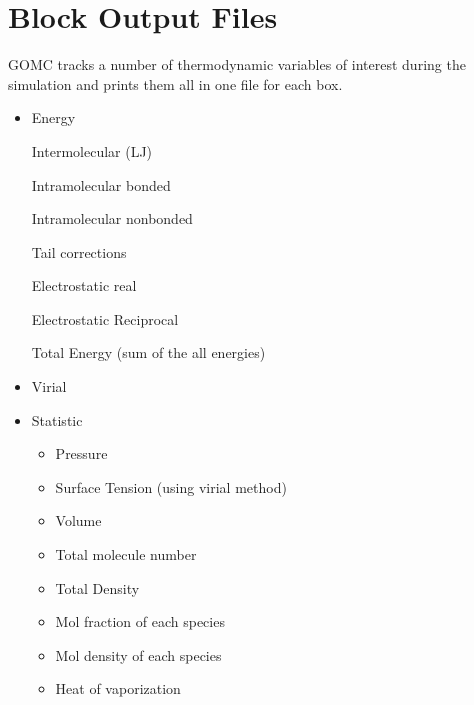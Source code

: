 \documentclass[letterpaper,10pt,english]{sphinxmanual}
\begin{document}
\section{Block Output Files}
\label{\detokenize{output_file:block-output-files}}
\sphinxAtStartPar
GOMC tracks a number of thermodynamic variables of interest during the simulation and prints them all in one file for each box.
\begin{itemize}
\item {} 
\sphinxAtStartPar
Energy

\sphinxAtStartPar
\textendash{} Intermolecular (LJ)

\sphinxAtStartPar
\textendash{} Intramolecular bonded

\sphinxAtStartPar
\textendash{} Intramolecular nonbonded

\sphinxAtStartPar
\textendash{} Tail corrections

\sphinxAtStartPar
\textendash{} Electrostatic real

\sphinxAtStartPar
\textendash{} Electrostatic Reciprocal

\sphinxAtStartPar
\textendash{} Total Energy (sum of the all energies)

\item {} 
\sphinxAtStartPar
Virial

\item {} 
\sphinxAtStartPar
Statistic
\begin{itemize}
\item {} 
\sphinxAtStartPar
Pressure

\item {} 
\sphinxAtStartPar
Surface Tension (using virial method)

\item {} 
\sphinxAtStartPar
Volume

\item {} 
\sphinxAtStartPar
Total molecule number

\item {} 
\sphinxAtStartPar
Total Density

\item {} 
\sphinxAtStartPar
Mol fraction of each species

\item {} 
\sphinxAtStartPar
Mol density of each species

\item {} 
\sphinxAtStartPar
Heat of vaporization

\end{itemize}

\end{itemize}
\end{document}
